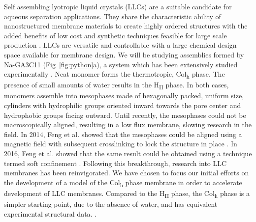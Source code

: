 Self assembling lyotropic liquid crystals (LLCs) are a suitable candidate
for aqueous separation applications. They share the characteristic
ability of nanostructured membrane materials to create highly ordered 
structures with the added benefits of low cost and synthetic techniques
feasible for large scale production \cite{feng_scalable_2014}. LLCs are
versatile and controllable with a large chemical design space available
for membrane design. We will be studying assemblies formed by Na-GA3C11 
(Fig~\ref{fig:python}a), a system which
has been extensively studied experimentally \cite{smith_ordered_1997,
zhou_supported_2005,resel_h2-phase_2000,feng_scalable_2014,feng_thin_2016}. 
Neat monomer forms the thermotropic, Col\textsubscript{h} phase. The 
presence of small amounts of water results in the H\textsubscript{II} 
phase. In both cases, monomers assemble into mesophases made of 
hexagonally packed, uniform size, cylinders with hydrophilic groups oriented inward
towards the pore center and hydrophobic groups facing outward. Until
recently, the mesophases could not be macroscopically aligned, resulting
in a low flux membrane, slowing research in the field. In 2014, 
Feng et al. showed that the mesophases could be aligned using a magnetic
field with subsequent crosslinking to lock the structure in place
\cite{feng_scalable_2014}. In 2016, Feng et al. showed that the same 
result could be obtained using a technique termed soft confinement
\cite{feng_thin_2016}. Following this breakthrough, research into LLC
membranes has been reinvigorated. We have chosen to focus our initial efforts 
on the development of a model of the Col\textsubscript{h} phase membrane
in order to accelerate development of LLC membranes.  Compared to the 
H\textsubscript{II} phase, the Col\textsubscript{h} phase is a simpler
starting point, due to the absence of water, and has equivalent 
experimental structural data. 
. 

